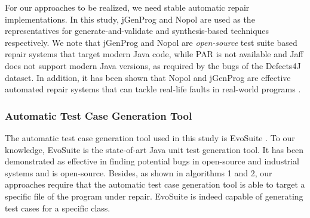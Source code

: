 \documentclass[]{sig-alternate}
\begin{document}
For our approaches to be realized, we need stable automatic repair implementations.
In this study, jGenProg \cite{astor2016} and Nopol \cite{nopol} are used as the representatives for generate-and-validate and synthesis-based techniques respectively. We note that jGenProg and Nopol are \emph{open-source} test suite based repair systems that target modern Java code, while PAR \cite{kim2013automatic} is not available and Jaff \cite{4630793} does not support modern Java versions, as required by the bugs of the Defects4J dataset. In addition, it has been shown that Nopol and jGenProg are effective automated repair systems that can tackle real-life faults in real-world programs \cite{defects4j-repair}.
  

\subsubsection{Automatic Test Case Generation Tool}
  
The automatic test case generation tool used in this study is EvoSuite \cite{evosuite}. To our knowledge, EvoSuite is the state-of-art Java unit test generation tool.
It has been demonstrated as effective in finding potential bugs in open-source and industrial systems and is open-source. 
Besides, as shown in algorithms 1 and 2, our approaches require that the automatic test case generation tool is able to target a specific file of the program under repair. EvoSuite is indeed capable of generating test cases for a specific class.
\end{document}
